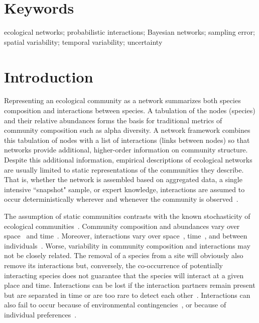 \documentclass[12pt]{article}
\begin{document}
\begin{spacing}{2.0}
\section*{\small Keywords}

ecological networks; probabilistic interactions; Bayesian networks; sampling error; spatial variability; temporal variability; uncertainty

\clearpage

\section*{Introduction}

    Representing an ecological community as a network summarizes both species composition and interactions between species. A tabulation of the nodes (species) and their relative abundances forms the basis for traditional metrics of community composition such as alpha diversity. A network framework combines this tabulation of nodes with a list of interactions (links between nodes) so that networks provide additional, higher-order information on community structure. Despite this additional information, empirical descriptions of ecological networks are usually limited to static representations of the communities they describe. That is, whether the network is assembled based on aggregated data, a single intensive ``snapshot" sample, or expert knowledge, interactions are assumed to occur deterministically wherever and whenever the community is observed~\citep{Olesen2011a}. 


    The assumption of static communities contrasts with the known stochasticity of ecological communities~\citep{Gotelli2000}. Community composition and abundances vary over space~\citep{Baiser2012} and time~\citep{Olesen2011a}. Moreover, interactions vary over space~\citep{Kitching1987,Baiser2012}, time~\citep{Kitching1987,Olesen2011a}, and between individuals~\citep{Pires2011a,Fodrie2015,Novak2015}. Worse, variability in community composition and interactions may not be closely related. The removal of a species from a site will obviously also remove its interactions but, conversely, the co-occurrence of potentially interacting species does not guarantee that the species will interact at a given place and time. Interactions can be lost if the interaction partners remain present but are separated in time or are too rare to detect each other~\citep{Tylianakis2010}. Interactions can also fail to occur because of environmental contingencies~\citep{Poisot2015}, or because of individual preferences~\citep{Fodrie2015}. 



\end{spacing}
\end{document}
